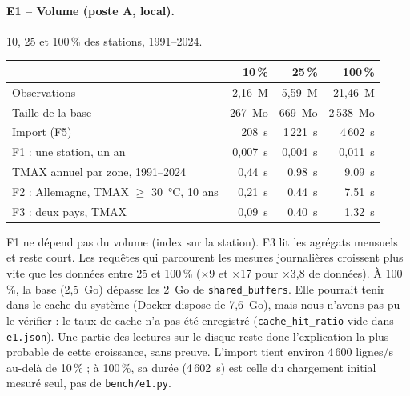 \documentclass{rapportClass}
\newcommand{\cmd}[1]{\texttt{#1}}
\begin{document}
\paragraph{E1 -- Volume (poste A, local).} 10, 25 et 100\,\% des stations, 1991--2024.
\begin{table}[H]
\centering\small
\begin{tabular}{lrrr}
\toprule
 & 10\,\% & 25\,\% & 100\,\% \\
\midrule
Observations & 2,16~M & 5,59~M & 21,46~M \\
Taille de la base & 267~Mo & 669~Mo & 2\,538~Mo \\
Import (F5) & 208~s & 1\,221~s & 4\,602~s \\
F1 : une station, un an & 0,007~s & 0,004~s & 0,011~s \\
TMAX annuel par zone, 1991--2024 & 0,44~s & 0,98~s & 9,09~s \\
F2 : Allemagne, TMAX $\ge$ 30~°C, 10 ans & 0,21~s & 0,44~s & 7,51~s \\
F3 : deux pays, TMAX & 0,09~s & 0,40~s & 1,32~s \\
\bottomrule
\end{tabular}
\end{table}
F1 ne dépend pas du volume (index sur la station). F3 lit les agrégats mensuels et reste court. Les requêtes qui
parcourent les mesures journalières croissent plus vite que les données entre 25 et 100\,\% (×9 et ×17 pour ×3,8
de données). À 100\,\%, la base (2,5~Go) dépasse les 2~Go de \cmd{shared\_buffers}. Elle pourrait tenir dans le
cache du système (Docker dispose de 7,6~Go), mais nous n'avons pas pu le vérifier : le taux de cache n'a pas été
enregistré (\cmd{cache\_hit\_ratio} vide dans \cmd{e1.json}). Une partie des lectures sur le disque reste donc
l'explication la plus probable de cette croissance, sans preuve. L'import tient environ 4\,600 lignes/s au-delà de 10\,\% ;
à 100\,\%, sa durée (4\,602~s) est celle du chargement initial mesuré seul, pas de \cmd{bench/e1.py}.
\end{document}
